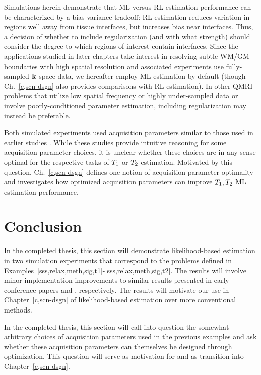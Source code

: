 Simulations herein demonstrate
that ML versus RL estimation performance
can be characterized by a bias-variance tradeoff: 
RL estimation reduces variation 
in regions well away from tissue interfaces,
but increases bias near interfaces.
Thus, 
a decision of whether to include regularization 
(and with what strength)
should consider the degree 
to which regions of interest contain interfaces.
Since the applications studied in later chapters
take interest in resolving subtle WM/GM boundaries 
with high spatial resolution
and associated experiments use fully-sampled $\mathbf{k}$-space data,
we hereafter employ ML estimation by default
(though Ch.~\ref{c,scn-dsgn} also provides comparisons with RL estimation).
In other QMRI problems
that utilize low spatial frequency or highly under-sampled data
or involve poorly-conditioned parameter estimation,
including regularization may instead be preferable.

Both simulated experiments
used acquisition parameters
similar to those used 
in earlier studies \cite{deoni:03:rct,heule:14:reo}.
While these studies provide intuitive reasoning
for some acquisition parameter choices,
it is unclear 
whether these choices are
in any sense optimal
for the respective tasks of $T_1$ or $T_2$ estimation.
Motivated by this question,
Ch.~\ref{c,scn-dsgn} defines one notion
of acquisition parameter optimality
and investigates how optimized acquisition parameters
can improve $T_1,T_2$ ML estimation performance.

\section{Conclusion}
\label{s,relax,conc}

In the completed thesis,
this section will demonstrate likelihood-based estimation
in two simulation experiments
that correspond to the problems
defined in Examples~\ref{sss,relax,meth,sig,t1}-\ref{sss,relax,meth,sig,t2}.
The results will involve minor implementation improvements
to similar results presented 
in early conference papers 
\cite{nataraj:14:rje} and \cite{nataraj:14:mbe},
respectively.
The results will motivate our use 
in Chapter~\ref{c,scn-dsgn}
of likelihood-based estimation
over more conventional methods.

In the completed thesis,
this section will call into question
the somewhat arbitrary choices
of acquisition parameters 
used in the previous examples
and ask whether these acquisition parameters
can themselves be designed 
through optimization.
This question will serve 
as motivation for 
and as transition into Chapter~\ref{c,scn-dsgn}.
